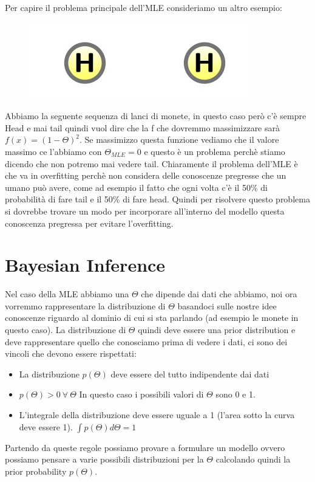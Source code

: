 \documentclass[14pt]{extreport}
\begin{document}
Per capire il problema principale dell'MLE consideriamo un altro esempio:
\begin{figure}[H]
	\centering
	\includegraphics[width=0.3\linewidth]{27.jpeg}
\end{figure}
Abbiamo la seguente sequenza di lanci di monete, in questo caso però c'è sempre Head e mai tail quindi vuol dire che la f che dovremmo massimizzare
sarà $f(x)=(1-\Theta)^2$. Se massimizzo questa funzione vediamo che il valore massimo ce l'abbiamo con $\Theta_{MLE} = 0$ e questo è un problema
perchè stiamo dicendo che non potremo mai vedere tail. Chiaramente il problema dell'MLE è che va in overfitting perchè non considera delle conoscenze
pregresse che un umano può avere, come ad esempio il fatto che ogni volta c'è il 50\% di probabilità di fare tail e il 50\% di fare head. Quindi per
risolvere questo problema si dovrebbe trovare un modo per incorporare all'interno del modello questa conoscenza pregressa per evitare l'overfitting.


\section{Bayesian Inference}

Nel caso della MLE abbiamo una $\Theta$ che dipende dai dati che abbiamo, noi ora vorremmo rappresentare la distribuzione di $\Theta$ basandoci sulle
nostre idee conoscenze riguardo al dominio di cui si sta parlando (ad esempio le monete in questo caso). La distribuzione di $\Theta$ quindi deve
essere una prior distribution e deve rappresentare quello che conosciamo prima di vedere i dati, ci sono dei vincoli che devono essere rispettati:
\begin{itemize}
	\item La distribuzione $p(\Theta)$ deve essere del tutto indipendente dai dati
	\item $p(\Theta)>0 \ \forall \ \Theta$ In questo caso i possibili valori di $\Theta$ sono 0 e 1.
	\item L'integrale della distribuzione deve essere uguale a 1 (l'area sotto la curva deve essere 1). $\int p(\Theta) d\Theta = 1$
\end{itemize}

Partendo da queste regole possiamo provare a formulare un modello ovvero possiamo pensare a varie possibili distribuzioni per la $	\Theta$ calcolando
quindi la prior probability $p(\Theta)$.
\end{document}
